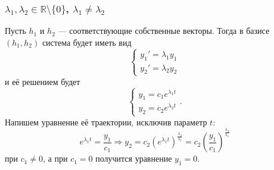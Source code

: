 \subsubsection{$\lambda_1, \lambda_2 \in \mathbb R \setminus \{0\}$, $\lambda_1 \ne \lambda_2$}
Пусть $h_1$ и $h_2$ --- соответствующие собственные векторы.
Тогда в базисе $(h_1, h_2)$ система будет иметь вид
\[
    \begin{cases}
        y_1' = \lambda_1 y_1 \\
        y_2' = \lambda_2 y_2
    \end{cases}
\]
и её решением будет
\[
    \begin{cases}
        y_1 = c_1 e^{\lambda_1 t} \\
        y_2 = c_2 e^{\lambda_2 t}
    \end{cases} .
\]
Напишем уравнение её траектории, исключив параметр $t$:
\[
    e^{\lambda_1 t} = \frac{y_1}{c_1} \Rightarrow y_2 = c_2(e^{\lambda_1 t})^{\frac{\lambda_2}{\lambda_1}} = c_2 \left(\frac{y_1}{c_1} \right)^{\frac{\lambda_2}{\lambda_1}}
\]
при $c_1 \ne 0$, а при $c_1 = 0$ получится уравнение $y_1 = 0$.

